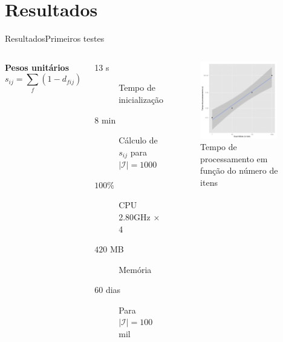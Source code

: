 \section[Resultados]{Resultados}

\begin{frame}{Resultados}{Primeiros testes}
\begin{columns}[c]
\textbf{Pesos unitários}
$$
    s_{ij} = \sum_{f}{\left(1-d_{fij}\right)}
$$
\begin{description}
	\item[13 s] Tempo de inicialização
	\item[8 min] Cálculo de $s_{ij}$ para $\left|\mathcal{I}\right| = 1000$
	\item[$100 \%$] CPU \\ 2.80GHz $\times$ 4
	\item[$420$ MB] Memória 
	\item[]
	\item[60 dias] Para $\left|\mathcal{I}\right| = 100$  mil
\end{description}	
\begin{figure}[ht]
    \begin{center}
    \includegraphics[width=0.9\textwidth]{img/ixt}
    \end{center}
\caption{Tempo de processamento em função do número de itens}
\end{figure}
\end{columns}
\end{frame}


